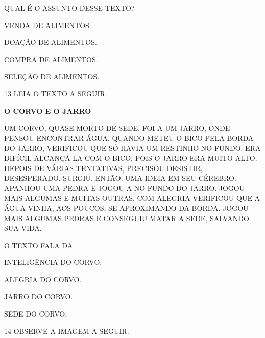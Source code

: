 QUAL É O ASSUNTO DESSE TEXTO?

\begin{escolha}

\item VENDA DE ALIMENTOS.

\item DOAÇÃO DE ALIMENTOS.

\item COMPRA DE ALIMENTOS.

\item SELEÇÃO DE ALIMENTOS.

\end{escolha}

\num{13} LEIA O TEXTO A SEGUIR.

\begin{myquote}
\textbf{O CORVO E O JARRO}

UM CORVO, QUASE MORTO DE SEDE, FOI A UM JARRO, ONDE PENSOU ENCONTRAR ÁGUA. QUANDO METEU O BICO PELA BORDA DO JARRO, VERIFICOU QUE SÓ HAVIA UM RESTINHO NO FUNDO. ERA DIFÍCIL ALCANÇÁ-LA COM O BICO, POIS O JARRO ERA MUITO ALTO.
DEPOIS DE VÁRIAS TENTATIVAS, PRECISOU DESISTIR, DESESPERADO. SURGIU, ENTÃO, UMA IDEIA EM SEU CÉREBRO.
APANHOU UMA PEDRA E JOGOU-A NO FUNDO DO JARRO. JOGOU MAIS
ALGUMAS E MUITAS OUTRAS.
COM ALEGRIA VERIFICOU QUE A ÁGUA VINHA, AOS POUCOS, SE APROXIMANDO DA BORDA. JOGOU MAIS ALGUMAS PEDRAS E CONSEGUIU MATAR A SEDE, SALVANDO SUA VIDA.

\end{myquote}

O TEXTO FALA DA

\begin{escolha}

\item INTELIGÊNCIA DO CORVO.

\item ALEGRIA DO CORVO.

\item JARRO DO CORVO.

\item SEDE DO CORVO.

\end{escolha}

\num{14} OBSERVE A IMAGEM A SEGUIR.

